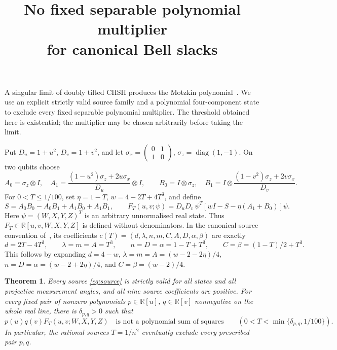 \documentclass[11pt]{article}
\title{No fixed separable polynomial multiplier\\for canonical Bell slacks}
\author{}\date{}
\newtheorem{theorem}{Theorem}
\newcommand{\R}{\mathbb R}
\begin{document}
\maketitle\vspace{-2em}

A singular limit of doubly tilted CHSH produces the Motzkin
polynomial~\cite{Chaturvedi}. We use an explicit strictly valid source
family and a polynomial four-component state to exclude every fixed
separable polynomial multiplier. The threshold obtained here is
existential; the multiplier may be chosen arbitrarily before taking
the limit.

Put $D_u=1+u^2$, $D_v=1+v^2$, and let
$\sigma_x=\left(\begin{smallmatrix}0&1\\1&0\end{smallmatrix}\right)$,
$\sigma_z=\operatorname{diag}(1,-1)$. On two qubits choose
\[
 A_0=\sigma_z\otimes I,\quad
 A_1=\frac{(1-u^2)\sigma_z+2u\sigma_x}{D_u}\otimes I,
 \qquad
 B_0=I\otimes\sigma_z,\quad
 B_1=I\otimes\frac{(1-v^2)\sigma_z+2v\sigma_x}{D_v}.
\]
For $0<T\le1/100$, set $\eta=1-T$, $w=4-2T+4T^3$, and define
\begin{equation}
 S=A_0B_0-A_0B_1+A_1B_0+A_1B_1,\qquad
 F_T(u,v;\psi)=D_uD_v\,\psi^T
       [wI-S-\eta(A_1+B_0)]\psi .                 \label{eq:parent}
\end{equation}
Here $\psi=(W,X,Y,Z)^T$ is an arbitrary unnormalised real state.
Thus $F_T\in\R[u,v,W,X,Y,Z]$ is defined without denominators.
In the canonical source convention of~\cite{Canonical}, its coefficients
$c(T)=(d,\lambda,n,m,C,A,D,\alpha,\beta)$ are exactly
\begin{equation}
 d=2T-4T^3,\qquad \lambda=m=A=T^3,\qquad
 n=D=\alpha=1-T+T^3,\qquad C=\beta=(1-T)/2+T^3.
                                                        \label{eq:source}
\end{equation}
This follows by expanding
$d=4-w$, $\lambda=m=A=(w-2-2\eta)/4$,
$n=D=\alpha=(w-2+2\eta)/4$, and $C=\beta=(w-2)/4$.

\begin{theorem}\label{thm:main}
Every source \eqref{eq:source} is strictly valid for all states and
all projective measurement angles, and all nine source coefficients
are positive. For every fixed pair of nonzero polynomials
$p\in\R[u]$, $q\in\R[v]$ nonnegative on the whole real line, there is
$\delta_{p,q}>0$ such that
\begin{equation}
 p(u)q(v)F_T(u,v;W,X,Y,Z)
 \quad\text{is not a polynomial sum of squares}
 \qquad(0<T<\min\{\delta_{p,q},1/100\}).            \label{eq:main}
\end{equation}
In particular, the rational sources $T=1/n^2$ eventually exclude every
prescribed pair $p,q$.
\end{theorem}
\end{document}
